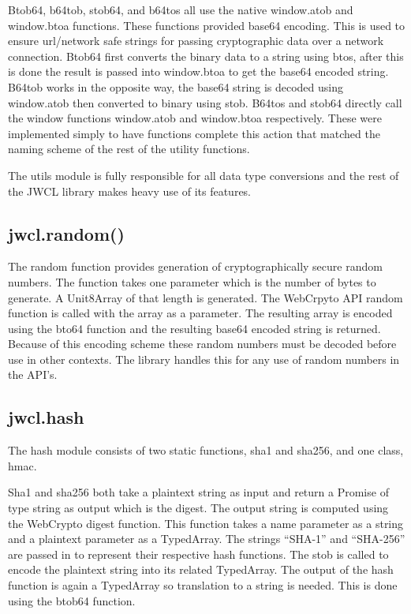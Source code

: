 Btob64, b64tob, stob64, and b64tos all use the native window.atob and window.btoa functions. \cite{mdn-base} These functions provided base64 encoding. This is used to ensure url/network safe strings for passing cryptographic data over a network connection. Btob64 first converts the binary data to a string using btos, after this is done the result is passed into window.btoa to get the base64 encoded string. B64tob works in the opposite way, the base64 string is decoded using window.atob then converted to binary using stob. B64tos and stob64 directly call the window functions window.atob and window.btoa respectively. These were implemented simply to have functions complete this action that matched the naming scheme of the rest of the utility functions.


The utils module is fully responsible for all data type conversions and the rest of the JWCL library makes heavy use of its features.


\subsection{jwcl.random()}


The random function provides generation of cryptographically secure random numbers. The function takes one parameter which is the number of bytes to generate. A Unit8Array of that length is generated. The WebCrpyto API random function is called with the array as a parameter. The resulting array is encoded using the bto64 function and the resulting base64 encoded string is returned. Because of this encoding scheme these random numbers must be decoded before use in other contexts. The library handles this for any use of random numbers in the API’s.


\subsection{jwcl.hash}


The hash module consists of two static functions, sha1 and sha256, and one class, hmac.


Sha1 and sha256 both take a plaintext string as input and return a Promise of type string as output which is the digest. The output string is computed using the WebCrypto digest function. This function takes a name parameter as a string and a plaintext parameter as a TypedArray. The strings “SHA-1” and “SHA-256” are passed in to represent their respective hash functions. The stob is called to encode the plaintext string into its related TypedArray. The output of the hash function is again a TypedArray so translation to a string is needed. This is done using the btob64 function.


